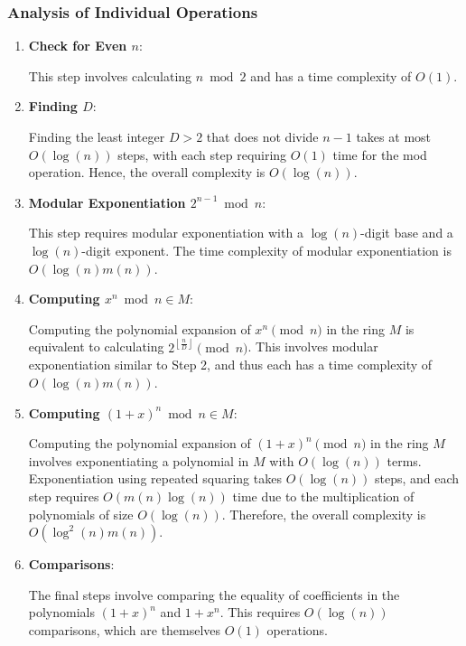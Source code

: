 \documentclass{article}
\theoremstyle{plain}
\theoremstyle{definition}
\newcommand{\floor}[1]{\left\lfloor #1 \right\rfloor}
\newcommand{\Mx}{M}
\begin{document}
\subsubsection{Analysis of Individual Operations}
\begin{enumerate}
    \item \textbf{Check for Even \( n \)}:
    
        This step involves calculating $n \bmod{2}$ and has a time complexity of \( O(1) \).

    \item \textbf{Finding \( D \)}:
    
        Finding the least integer \( D > 2 \) that does not divide \( n-1 \) takes at most \( O(\log(n)) \) steps, with each step requiring \( O(1) \) time for the mod operation. Hence, the overall complexity is \( O(\log(n)) \).

    \item \textbf{Modular Exponentiation \( 2^{n-1} \bmod n \)}:
    
        This step requires modular exponentiation with a \( \log(n) \)-digit base and a \( \log(n) \)-digit exponent. The time complexity of modular exponentiation is \( O(\log(n) m(n)) \).

    \item \textbf{Computing \( x^n \bmod{n} \in \Mx \)}:
    
        Computing the polynomial expansion of $x^n \pmod{n}$ in the ring \( \Mx \) is equivalent to calculating $2^{\floor{\frac{n}{D}}} \pmod{n}$. This involves modular exponentiation similar to Step 2, and thus each has a time complexity of \( O(\log(n) m(n)) \).

    \item \textbf{Computing \( (1+x)^n \bmod{n} \in \Mx \)}:
    
        Computing the polynomial expansion of \( (1+x)^n \pmod{n} \) in the ring \( \Mx \) involves exponentiating a polynomial in $\Mx$ with \( O(\log(n)) \) terms. Exponentiation using repeated squaring takes \( O(\log(n)) \) steps, and each step requires \( O(m(n)\log(n)) \) time due to the multiplication of polynomials of size \( O(\log(n)) \). Therefore, the overall complexity is \( O(\log^2(n) m(n)) \).
         
    \item \textbf{Comparisons}:
    
        The final steps involve comparing the equality of coefficients in the polynomials $(1+x)^n$ and $1 + x^n$. This requires $O(\log(n))$ comparisons, which are themselves \( O(1) \) operations.
\end{enumerate}
\end{document}
